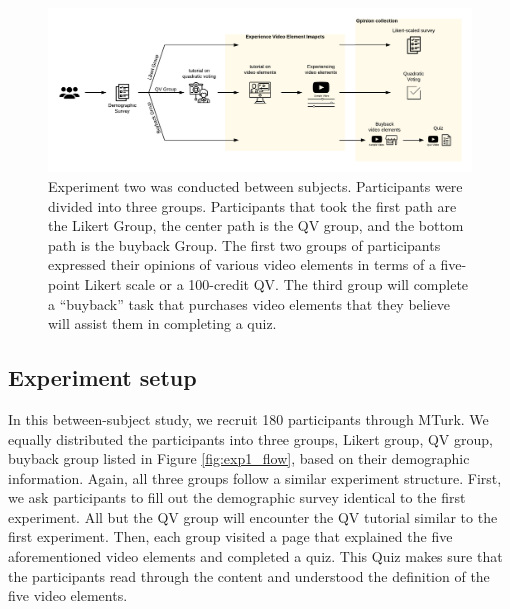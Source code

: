 
\begin{figure}[htpb]
    \centering
    \includegraphics[width=\textwidth, keepaspectratio=true]{content/image/exp2_flow.pdf}
    \caption{
        Experiment two was conducted between subjects. Participants were divided into three groups. Participants that took the first path are the Likert Group, the center path is the QV group, and the bottom path is the buyback Group. The first two groups of participants expressed their opinions of various video elements in terms of a five-point Likert scale or a 100-credit QV. The third group will complete a ``buyback'' task that purchases video elements that they believe will assist them in completing a quiz.
    }
    \label{fig:exp2_flow}
\end{figure}

\subsection{Experiment setup}
In this between-subject study, we recruit 180 participants through MTurk.
We equally distributed the participants into three groups, Likert group, QV group, buyback group listed in Figure \ref{fig:exp1_flow}, based on their demographic information.
Again, all three groups follow a similar experiment structure.
First, we ask participants to fill out the demographic survey identical to the first experiment.
All but the QV group will encounter the QV tutorial similar to the first experiment.
Then, each group visited a page that explained the five aforementioned video elements and completed a quiz.
This Quiz makes sure that the participants read through the content and understood the definition of the five video elements.

